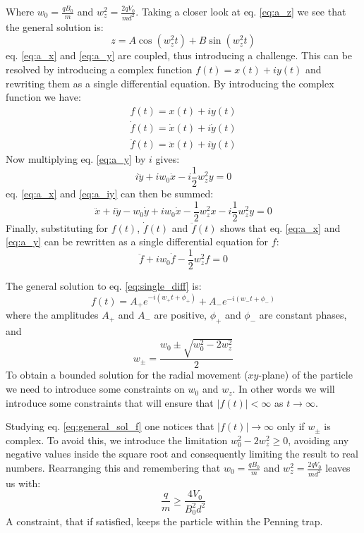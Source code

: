 \documentclass[english,notitlepage,reprint,nofootinbib]{revtex4-1}  %
\begin{document}
Where $w_0 = \frac{qB_0}{m}$ and $w_z^2 = \frac{2qV_0}{md^2}$. Taking a closer look at eq. \ref*{eq:a_z} we see that the general solution is:
\begin{equation}
    z = A \cos(w_z^2 t) + B \sin(w_z^2 t)
\end{equation}
eq. \ref*{eq:a_x} and \ref*{eq:a_y} are coupled, thus introducing a challenge. This can be resolved by introducing a complex function $f(t) = x(t) + iy(t)$ and rewriting them as a single differential equation. By introducing the complex function we have:
\begin{align}
    f(t) = x(t) + iy(t) \\
    \dot{f}(t) = \dot{x}(t) + i\dot{y}(t) \\
    \ddot{f}(t) = \ddot{x}(t) + i\ddot{y}(t)
\end{align}
Now multiplying eq. \ref*{eq:a_y} by $i$ gives:
\begin{equation}
    i\ddot{y} + iw_0 \dot{x} - i\frac{1}{2} w_z^2 y = 0 \label{eq:a_iy}
\end{equation}
eq. \ref*{eq:a_x} and \ref*{eq:a_iy} can then be summed:
\begin{equation}
    \ddot{x}+ i\ddot{y} - w_0 \dot{y} + iw_0 \dot{x} - \frac{1}{2} w_z^2 x - i\frac{1}{2} w_z^2 y= 0
\end{equation}
Finally, substituting for $f(t)$, $\dot{f}(t)$ and $\ddot{f}(t)$ shows that eq. \ref*{eq:a_x} and \ref*{eq:a_y} can be rewritten as a single differential equation for $f$:
\begin{equation}
    \ddot{f} + i w_0 \dot{f} - \frac{1}{2} w_z^2 f = 0 \label{eq:single_diff}
\end{equation}

The general solution to eq. \ref*{eq:single_diff} is:
\begin{equation}
    f(t) = A_+ e^{-i(w_+ t + \phi_+)} + A_- e^{-i(w_- t + \phi_-)} \label{eq:general_sol_f}
\end{equation}
where the amplitudes $A_+$ and $A_-$ are positive, $\phi_+$ and $\phi_-$ are constant phases, and
\begin{equation}
    w_\pm = \frac{w_0 \pm \sqrt{w_0^2 - 2 w_z^2}}{2}
\end{equation}
To obtain a bounded solution for the radial movement ($xy$-plane) of the particle we need to introduce some constraints on $w_0$ and $w_z$. In other words we will introduce some constraints that will ensure that $|f(t)| < \infty$ as $t \rightarrow \infty$.

Studying eq. \ref*{eq:general_sol_f} one notices that $|f(t)| \rightarrow \infty$ only if $w_\pm$ is complex. To avoid this, we introduce the limitation $w_0^2 - 2 w_z^2 \geq 0$, avoiding any negative values inside the square root and consequently limiting the result to real numbers. Rearranging this and remembering that $w_0 = \frac{qB_0}{m}$ and $w_z^2 = \frac{2qV_0}{md^2}$ leaves us with:
\begin{equation}
    \frac{q}{m} \geq \frac{4 V_0}{B_0^2 d^2}
\end{equation}
A constraint, that if satisfied, keeps the particle within the Penning trap.
\end{document}
